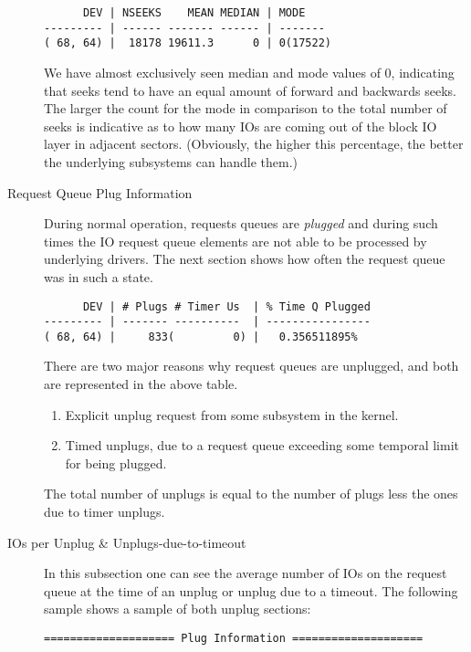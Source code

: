 \documentclass{article}
\begin{document}
\begin{description}
\begin{verbatim}
      DEV | NSEEKS    MEAN MEDIAN | MODE
--------- | ------ ------- ------ | -------
( 68, 64) |  18178 19611.3      0 | 0(17522)
\end{verbatim}

  We have almost exclusively seen median and mode values of 0, indicating
  that seeks tend to have an equal amount of forward and backwards
  seeks. The larger the count for the mode in comparison to the total
  number of seeks is indicative as to how many IOs are coming out of
  the block IO layer in adjacent sectors. (Obviously, the higher this
  percentage, the better the underlying subsystems can handle them.)

  \item[Request Queue Plug Information]

  During normal operation, requests queues are \emph{plugged} and during
  such times the IO request queue elements are not able to be processed
  by underlying drivers. The next section shows how often the request
  queue was in such a state.

\begin{verbatim}
      DEV | # Plugs # Timer Us  | % Time Q Plugged
--------- | ------- ----------  | ----------------
( 68, 64) |     833(         0) |   0.356511895%
\end{verbatim}

  There are two major reasons why request queues are unplugged, and both
  are represented in the above table.

  \begin{enumerate}
    \item Explicit unplug request from some subsystem in the kernel.

    \item Timed unplugs, due to a request queue exceeding some temporal
    limit for being plugged.
  \end{enumerate}

  The total number of unplugs is equal to the number of plugs less the
  ones due to timer unplugs.

  \item[IOs per Unplug \& Unplugs-due-to-timeout]

  In this subsection one can see the average number of IOs on the request
  queue at the time of an unplug or unplug due to a timeout. The following
  sample shows a sample of both unplug sections:

\begin{verbatim}
==================== Plug Information ====================


\end{verbatim}
\end{description}
\end{document}
